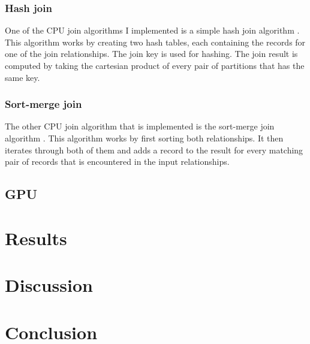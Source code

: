 \documentclass[a4paper,titlepage]{article}
\begin{document}
\subsubsection{Hash join}
One of the CPU join algorithms I implemented is a simple hash join algorithm \cite{dewitt1985}. This algorithm works by creating two hash tables, each containing the records for one of the join relationships. The join key is used for hashing. The join result is computed by taking the cartesian product of every pair of partitions that has the same key.

\subsubsection{Sort-merge join}
The other CPU join algorithm that is implemented is the sort-merge join algorithm \cite{blasgen1977}. This algorithm works by first sorting both relationships. It then iterates through both of them and adds a record to the result for every matching pair of records that is encountered in the input relationships.

\subsection{GPU}

\section{Results}
\label{sec:results}

\section{Discussion}
\label{sec:discussion}

\section{Conclusion}
\label{sec:conclusion}

{}

\end{document}
